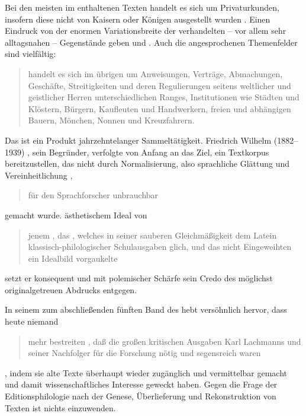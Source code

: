 %
Bei den meisten im \CAO{} enthaltenen Texten handelt es sich um Privaturkunden,
insofern diese nicht von Kaisern oder Königen ausgestellt wurden
\autocites[vgl.][575]{frenz1998a}[585]{frenz1998b}. Einen Eindruck von der
enormen Variationsbreite der verhandelten -- vor allem sehr alltagsnahen --
Gegen\-stände geben \citet[11]{schulze2011} und \citet[35--36]{ganslmayer2012}.
Auch die angesprochenen Themenfelder sind vielfältig:
\blockcquote[596]{schmidtwiegand1998b}{ handelt es sich im übrigen
um Anweisungen, Verträge, Abmachungen, Geschäfte, Streitigkeiten und deren
Regulierungen seitens weltlicher und geistlicher Herren unterschiedlichen
Ranges, Institutionen wie Städten und Klöstern, Bürgern, Kaufleuten und
Handwerkern, freien und abhängigen Bauern, Mönchen, Nonnen und Kreuzfahrern.}

Das \CAO{} ist ein Produkt jahrzehntelanger Sammeltätigkeit. Friedrich
Wilhelm\nocite{wilhelm1932} (1882--1939)%
, sein Begründer, verfolgte von Anfang an das Ziel, ein Textkorpus
bereitzustellen, das nicht durch Normalisierung, also sprachliche Glättung und
Vereinheitlichung \autocites[vgl.][76--84]{bein2011}{kragl2015},
\blockcquote[\RN{60}]{wilhelm1932}{für den Sprachforscher unbrauchbar} gemacht
wurde.  ästhetischem Ideal von
\blockcquote[\RN{3}]{wilhelm1932}{jenem , das
 \textelp{}, welches in seiner
sauberen Gleichmäßigkeit dem Latein klassisch-philo\-logi\-scher Schulausgaben
glich, und das \textelp{} nicht Eingeweihten ein Idealbild vorgaukelte} setzt
er konsequent und mit polemischer Schärfe sein Credo des möglichst
originalgetreuen Abdrucks entgegen.

In seinem  zum abschließenden fünften Band des
\CAO{} hebt \citeauthor{deboor1976} versöhnlich hervor, dass heute
niemand \blockcquote[\RN{13}]{deboor1976}{mehr bestreiten , daß
die großen kritischen Ausgaben Karl Lachmanns und seiner
Nachfolger für die Forschung nötig und segensreich waren}, indem sie alte Texte
überhaupt wieder zugänglich und vermittelbar gemacht und damit
wissenschaftliches Interesse geweckt haben. Gegen die Frage der
Editionsphilologie nach der Genese, Überlieferung und Rekonstruktion von Texten
ist nichts einzuwenden.

